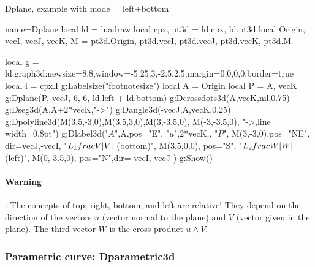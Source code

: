 \begin{demo}{Dplane, example with mode = left+bottom}
\begin{luadraw}{name=Dplane}
local ld = luadraw
local cpx, pt3d = ld.cpx, ld.pt3d
local Origin, vecI, vecJ, vecK, M = pt3d.Origin, pt3d.vecI, pt3d.vecJ, pt3d.vecK, pt3d.M

local g = ld.graph3d:new{size={8,8},window={-5.25,3,-2.5,2.5},margin={0,0,0,0},border=true}
local i = cpx.I
g:Labelsize("footnotesize")
local A = Origin
local P = {A, vecK}
g:Dplane(P, vecJ, 6, 6, ld.left + ld.bottom)
g:Dcrossdots3d({A,vecK},nil,0.75)
g:Dseg3d({A,A+2*vecK},"->")
g:Dangle3d(-vecJ,A,vecK,0.25)
g:Dpolyline3d({{M(3.5,-3,0),M(3.5,3,0)},{M(3,-3.5,0), M(-3,-3.5,0)}}, "->,line width=0.8pt")
g:Dlabel3d("$A$",A,{pos="E"},
    "$u$",2*vecK,{},
    "$P$", M(3,-3,0),{pos="NE", dir={vecJ,-vecI}},
    "$L_1\\frac{V}{\\|V\\|}$ (bottom)", M(3.5,0,0), {pos="S"},
    "$L_2\\frac{W}{\\|W\\|}$ (left)", M(0,-3.5,0), {pos="N",dir={-vecI,-vecJ}}
)
g:Show()
\end{luadraw}
\end{demo}

\paragraph{Warning}: The concepts of top, right, bottom, and left are relative! They depend on the direction of the vectors $u$ (vector normal to the plane) and $V$ (vector given in the plane). The third vector $W$ is the cross product $u\wedge V$.

\subsubsection{Parametric curve: Dparametric3d}

